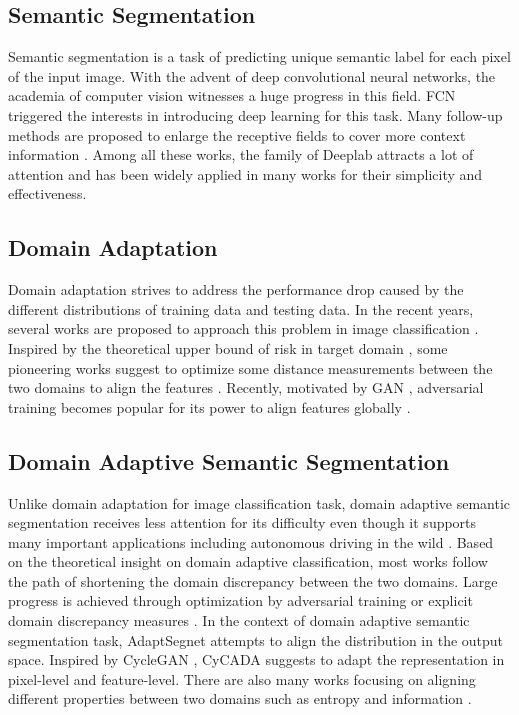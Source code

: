 \documentclass[runningheads]{llncs}
\begin{document}
\subsection{Semantic Segmentation}
Semantic segmentation is a task of predicting unique semantic label for each pixel of the input image. With the advent of deep convolutional neural networks, the academia of computer vision witnesses a huge progress in this field. FCN \cite{Shelhamer2017FCN} triggered the interests in introducing deep learning for this task. Many follow-up methods are proposed to enlarge the receptive fields to cover more context information \cite{deeplabv1, deeplabv2, zhao2017pspnet, deeplabv3plus2018}. Among all these works, the family of Deeplab \cite{deeplabv1, deeplabv2, deeplabv3plus2018} attracts a lot of attention and has been widely applied in many works for their simplicity and effectiveness. 

\subsection{Domain Adaptation}
Domain adaptation strives to address the performance drop caused by the different distributions of training data and testing data. In the recent years, several works are proposed to approach this problem in image classification \cite{saito2017maximum,Chen_2019_CVPR}. Inspired by the theoretical upper bound of risk in target domain \cite{Ben-David2010}, some pioneering works suggest to optimize some distance measurements between 
the two domains to align the features \cite{mmd,deep_coral}. Recently, motivated by GAN \cite{Goodfellow:2014:GAN:2969033.2969125}, adversarial training becomes popular for its power to align features globally \cite{Tsai_adaptseg_2018,no_more_discrimination,saito2017maximum}.

\subsection{Domain Adaptive Semantic Segmentation}
Unlike domain adaptation for image classification task, domain adaptive semantic segmentation receives less attention for its difficulty even though it supports many important applications including autonomous driving in the wild \cite{hoffman2016fcns, chen2018_dafrcnn}.
Based on the theoretical insight \cite{Ben-David2010} on domain adaptive classification, most works follow the path of shortening the domain discrepancy between the two domains.  Large progress is achieved through optimization by adversarial training or explicit domain discrepancy measures \cite{Tsai_adaptseg_2018, Hoffman_cycada2017,hoffman2016fcns}. In the context of domain adaptive semantic segmentation task, AdaptSegnet \cite{Tsai_adaptseg_2018} attempts to align the distribution in the output space. Inspired by CycleGAN \cite{CycleGAN2017}, CyCADA \cite{Hoffman_cycada2017} suggests to adapt the representation in pixel-level and feature-level. There are also many works focusing on aligning different properties between two domains such as entropy \cite{vu2018advent} and information \cite{Luo_2019_ICCV}. 
\end{document}
